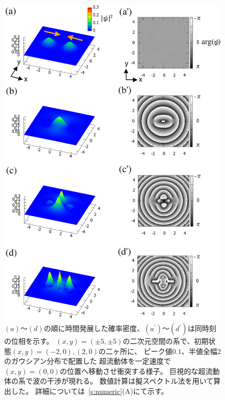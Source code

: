 \documentclass[12pt,a4paper]{jbook}
\begin{document}
		\begin{figure}[H]
			\begin{center}
				\includegraphics[width=14cm]{odlro2.eps}
				\caption{
					$(a)$～$(d)$の順に時間発展した確率密度、$(a^\prime)$～$(d^\prime)$は同時刻の位相を示す。
                    $(x,y)=(\pm5,\pm5)$の二次元空間の系で、初期状態$(x,y)=(-2,0),(2,0)$の二ヶ所に、
                    ピーク値$0.1$、半値全幅$2$のガウシアン分布で配置した
                    超流動体を一定速度で$(x,y)=(0,0)$の位置へ移動させ衝突する様子。
					巨視的な超流動体の系で波の干渉が現れる。
                    数値計算は擬スペクトル法を用いて算出した。
                    詳細については~\ref{s:numeric}(A)にて示す。
				}
				\label{FIG:odlro2}
			\end{center}
		\end{figure}
\end{document}
